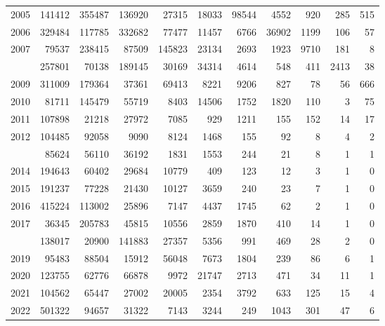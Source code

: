 \documentclass[
]{article}
\begin{document}
\begin{longtable}[t]{lrrrrrrrrrr}
2005 & 141412 & 355487 & 136920 & 27315 & 18033 & 98544 & 4552 & 920 & 285 & 515\\
2006 & 329484 & 117785 & 332682 & 77477 & 11457 & 6766 & 36902 & 1199 & 106 & 57\\
2007 & 79537 & 238415 & 87509 & 145823 & 23134 & 2693 & 1923 & 9710 & 181 & 8\\
\addlinespace
2008 & 257801 & 70138 & 189145 & 30169 & 34314 & 4614 & 548 & 411 & 2413 & 38\\
2009 & 311009 & 179364 & 37361 & 69413 & 8221 & 9206 & 827 & 78 & 56 & 666\\
2010 & 81711 & 145479 & 55719 & 8403 & 14506 & 1752 & 1820 & 110 & 3 & 75\\
2011 & 107898 & 21218 & 27972 & 7085 & 929 & 1211 & 155 & 152 & 14 & 17\\
2012 & 104485 & 92058 & 9090 & 8124 & 1468 & 155 & 92 & 8 & 4 & 2\\
\addlinespace
2013 & 85624 & 56110 & 36192 & 1831 & 1553 & 244 & 21 & 8 & 1 & 1\\
2014 & 194643 & 60402 & 29684 & 10779 & 409 & 123 & 12 & 3 & 1 & 0\\
2015 & 191237 & 77228 & 21430 & 10127 & 3659 & 240 & 23 & 7 & 1 & 0\\
2016 & 415224 & 113002 & 25896 & 7147 & 4437 & 1745 & 62 & 2 & 1 & 0\\
2017 & 36345 & 205783 & 45815 & 10556 & 2859 & 1870 & 410 & 14 & 1 & 0\\
\addlinespace
2018 & 138017 & 20900 & 141883 & 27357 & 5356 & 991 & 469 & 28 & 2 & 0\\
2019 & 95483 & 88504 & 15912 & 56048 & 7673 & 1804 & 239 & 86 & 6 & 1\\
2020 & 123755 & 62776 & 66878 & 9972 & 21747 & 2713 & 471 & 34 & 11 & 1\\
2021 & 104562 & 65447 & 27002 & 20005 & 2354 & 3792 & 633 & 125 & 15 & 4\\
2022 & 501322 & 94657 & 31322 & 7143 & 3244 & 249 & 1043 & 301 & 47 & 6\\*
\end{longtable}
\end{document}
